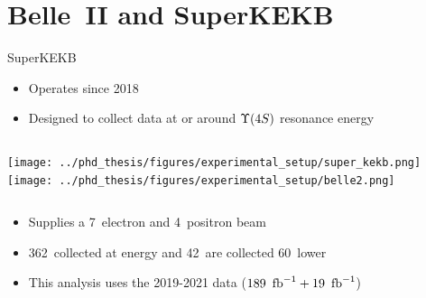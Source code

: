 \documentclass[xcolor=dvipsnames]{beamer}
\begin{document}

   \section{Belle~II and SuperKEKB}

   \begin{frame}{SuperKEKB}
      \scriptsize\centering

      \begin{itemize}
         \item Operates since 2018
         \item Designed to collect data at or around $\FourS$ resonance energy
      \end{itemize}

      \begin{columns}
         \texttt{[image: ../phd\_thesis/figures/experimental\_setup/super\_kekb.png]}
          \texttt{[image: ../phd\_thesis/figures/experimental\_setup/belle2.png]}
      \end{columns}

      \vspace{10pt}

      \begin{itemize}
         \item Supplies a 7~\gev electron and 4~\gev positron beam
         \item 362~\invfb collected at \FourS energy and 42~\invfb are collected 60~\mev lower
         \item This analysis uses the 2019-2021 data ($189~\mbox{\,fb}^{-1}+19~\mbox{\,fb}^{-1}$)
      \end{itemize}
   \end{frame}
\end{document}
